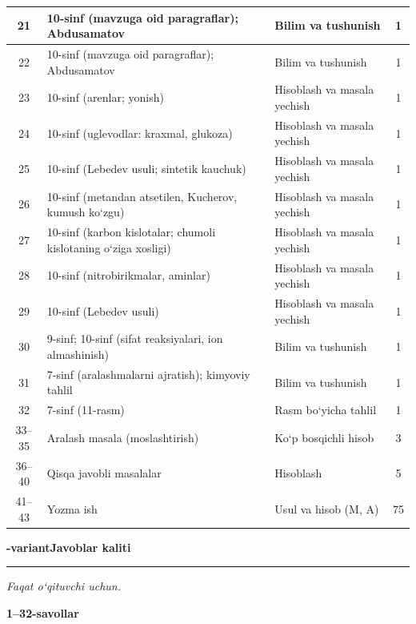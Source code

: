 \documentclass[11pt,a4paper]{article}
\newcommand{\hdrpill}[1]{\begin{tikzpicture}[baseline=0pt]\node[fill=ygreen,text=white,rounded corners=8pt,inner xsep=10pt,inner ysep=5pt,font=\fontsize{13}{15}\bfseries\selectfont] at (0,0.475){#1};\end{tikzpicture}}
\newcommand{\curvar}{}\fancyhead[R]{\hdrpill{\curvar}}
\begin{document}
{\begin{longtable}{|c|p{7.2cm}|p{5.4cm}|c|}
21 & 10-sinf (mavzuga oid paragraflar); Abdusamatov & Bilim va tushunish & 1\\\hline
22 & 10-sinf (mavzuga oid paragraflar); Abdusamatov & Bilim va tushunish & 1\\\hline
23 & 10-sinf (arenlar; yonish) & Hisoblash va masala yechish & 1\\\hline
24 & 10-sinf (uglevodlar: kraxmal, glukoza) & Hisoblash va masala yechish & 1\\\hline
25 & 10-sinf (Lebedev usuli; sintetik kauchuk) & Hisoblash va masala yechish & 1\\\hline
26 & 10-sinf (metandan atsetilen, Kucherov, kumush ko`zgu) & Hisoblash va masala yechish & 1\\\hline
27 & 10-sinf (karbon kislotalar; chumoli kislotaning o`ziga xosligi) & Hisoblash va masala yechish & 1\\\hline
28 & 10-sinf (nitrobirikmalar, aminlar) & Hisoblash va masala yechish & 1\\\hline
29 & 10-sinf (Lebedev usuli) & Hisoblash va masala yechish & 1\\\hline
30 & 9-sinf; 10-sinf (sifat reaksiyalari, ion almashinish) & Bilim va tushunish & 1\\\hline
31 & 7-sinf (aralashmalarni ajratish); kimyoviy tahlil & Bilim va tushunish & 1\\\hline
32 & 7-sinf (11-rasm) & Rasm bo`yicha tahlil & 1\\\hline
33--35 & Aralash masala (moslashtirish) & Ko`p bosqichli hisob & 3\\\hline
36--40 & Qisqa javobli masalalar & Hisoblash & 5\\\hline
41--43 & Yozma ish & Usul va hisob (M, A) & 75\\\hline
\end{longtable}}
\renewcommand{\curvar}{Javoblar}
\newpage
\noindent\textbf{\fontsize{13}{15}-variant}\hfill \textbf{Javoblar kaliti}\par\smallskip\hrule\smallskip
\textit{Faqat o`qituvchi uchun.}\par\medskip
\noindent\textbf{1--32-savollar}\par\smallskip
\end{document}
